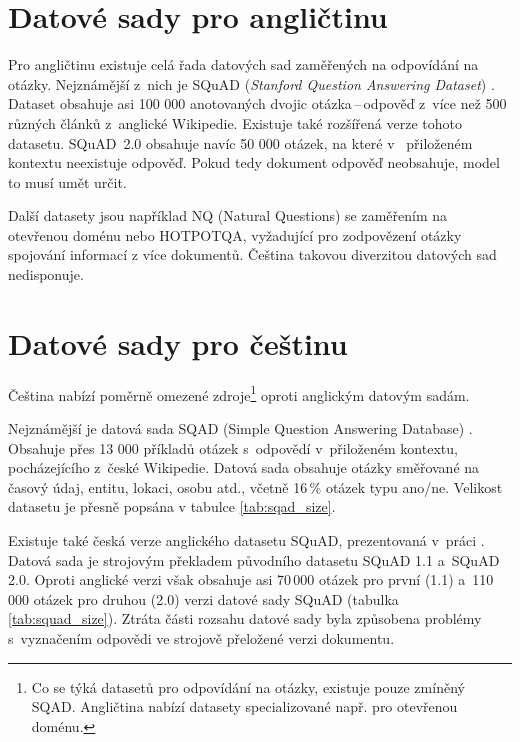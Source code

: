 \section{Datové sady pro angličtinu}
Pro angličtinu existuje celá řada datových sad zaměřených na odpovídání na otázky. Nejznámější z~nich je  SQuAD (\emph{Stanford Question Answering Dataset}) \cite{squad}. Dataset obsahuje asi 100 000 anotovaných dvojic otázka\,--\,odpověď z~více než 500 různých článků z~anglické Wikipedie. Existuje také rozšířená verze tohoto datasetu. SQuAD~2.0 \cite{squad_v2} obsahuje navíc 50 000 otázek, na které v~ přiloženém kontextu neexistuje odpověď. Pokud tedy dokument odpověď neobsahuje, model to musí umět určit.\par
Další datasety jsou například NQ (Natural Questions) se zaměřením na otevřenou doménu nebo HOTPOTQA, vyžadující pro zodpovězení otázky spojování informací z více dokumentů. Čeština takovou diverzitou datových sad nedisponuje.

\section{Datové sady pro češtinu}
Čeština nabízí poměrně omezené zdroje\footnote{Co se týká datasetů pro odpovídání na otázky, existuje pouze zmíněný SQAD. Angličtina nabízí datasety specializované např. pro otevřenou doménu.} oproti anglickým datovým sadám.\par 
Nejznámější je datová sada SQAD (Simple Question Answering Database) \cite{sqad}. Obsahuje přes 13 000 příkladů otázek s~odpovědí v~přiloženém kontextu, pocházejícího z~české Wikipedie. Datová sada obsahuje otázky směřované na časový údaj, entitu, lokaci, osobu atd., včetně 16\,\% otázek typu ano/ne. Velikost datasetu je přesně popsána v tabulce \ref{tab:sqad_size}.\par
Existuje také česká verze anglického datasetu SQuAD, prezentovaná v~práci \cite{czech_squad}. Datová sada je strojovým překladem původního datasetu SQuAD 1.1 a~SQuAD 2.0. Oproti anglické verzi však obsahuje asi 70\,000 otázek pro první (1.1) a~110\,000 otázek pro druhou (2.0) verzi datové sady SQuAD (tabulka \ref{tab:squad_size}). Ztráta části rozsahu datové sady byla způsobena problémy s~vyznačením odpovědi ve strojově přeložené verzi dokumentu.


